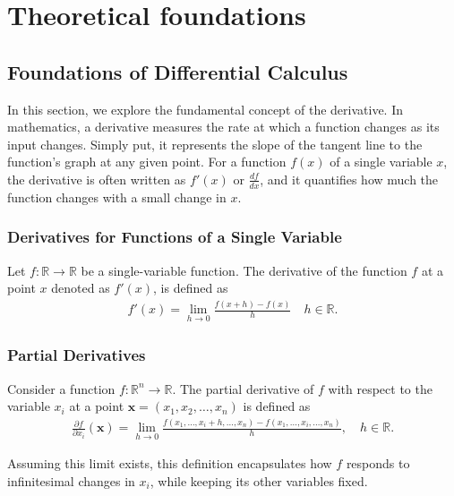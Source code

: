 \chapter{Theoretical foundations}\label{ch:introduction}

\section{Foundations of Differential Calculus}
\label{sec:foundationcalc}


In this section, we explore the fundamental concept of the derivative.
In mathematics, a derivative measures the rate at which a function changes as its input changes. 
Simply put, it represents the slope of the tangent line to the function's graph at any given point. 
For a function $f(x) $ of a single variable $ x $, the derivative is often written as $ f'(x)$  or $\frac{df}{dx} $,
and it quantifies how much the function changes with a small change in $ x $.

\subsection{Derivatives for Functions of a Single Variable}
\label{sec:derivative}

Let $ f: \mathbb{R} \to \mathbb{R} $ be a single-variable function. The derivative of the function $ f $ at a point $x$ denoted as $ f'(x) $, is defined as
\begin{align}
    f'(x) = \lim_{h \to 0} \frac{f(x + h) - f(x)}{h} \quad h \in \mathbb{R}.
\end{align}
\subsection{Partial Derivatives}
\label{sec:partial_derivative}


Consider a function $ f: \mathbb{R}^n \to \mathbb{R} $.
The partial derivative of $f$ with respect to the variable $ x_i $ at a point $ \mathbf{x} = (x_1, x_2, \ldots, x_n)$ is defined as
\begin{align}
 \frac{\partial f}{\partial x_i}(\mathbf{x}) = \lim_{h \to 0} \frac{f(x_1, \ldots, x_i+h, \ldots, x_n) - f(x_1, \ldots, x_i, \ldots, x_n)}{h}, \quad h \in \mathbb{R}.
\end{align}

Assuming this limit exists, this definition encapsulates how $f$ responds to infinitesimal changes in $x_i$, while keeping its other variables fixed.

